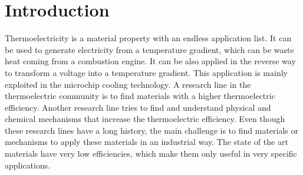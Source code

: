 
\chapter*{Introduction} %

\label{Chapter0} %


Thermoelectricity is a material property with an endless application list. It can be used to generate electricity 
from a temperature gradient, which can be waste heat coming from a combustion engine. It can be also applied in the 
reverse way to transform a voltage into a temperature gradient. This application is mainly exploited in the 
microchip cooling technology. A research line in the thermoelectric community is to find materials with a higher 
thermoelectric efficiency. Another research line tries to find and understand physical and chemical mechanisms that 
increase the thermoelectric efficiency. Even though these research lines have a long history, the main challenge is 
to find materials or mechanisms to apply these materials in an industrial way. The state of the art materials have 
very low efficiencies, which make them only useful in very specific applications. \\

